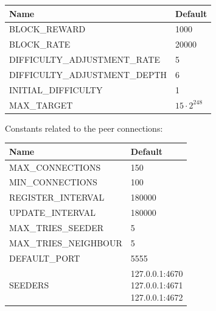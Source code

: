 \documentclass[../documentation.tex]{subfiles}
\begin{document}
\bgroup{}
\def\arraystretch{1.25}
\begin{tabular}{|l|l|}
    \hline
    \textbf{Name} & \textbf{Default}
    \\ \hline
    BLOCK\_REWARD & 1000
    \\ \hline
    BLOCK\_RATE & 20000
    \\ \hline
    DIFFICULTY\_ADJUSTMENT\_RATE & 5
    \\ \hline
    DIFFICULTY\_ADJUSTMENT\_DEPTH & 6
    \\ \hline
    INITIAL\_DIFFICULTY & 1
    \\ \hline
    MAX\_TARGET & \(15 \cdot 2^{248}\)
    \\ \hline
\end{tabular}
\egroup{}

Constants related to the peer connections:

\bgroup{}
\def\arraystretch{1.25}
\begin{tabular}{|l|l|}
    \hline
    \textbf{Name} & \textbf{Default}
    \\ \hline
    MAX\_CONNECTIONS & 150
    \\ \hline
    MIN\_CONNECTIONS & 100
    \\ \hline
    REGISTER\_INTERVAL & 180000
    \\ \hline
    UPDATE\_INTERVAL & 180000
    \\ \hline
    MAX\_TRIES\_SEEDER & 5
    \\ \hline
    MAX\_TRIES\_NEIGHBOUR & 5
    \\ \hline
    DEFAULT\_PORT & 5555
    \\ \hline
    SEEDERS & \makecell[t] {
        127.0.0.1:4670 \\
        127.0.0.1:4671 \\
        127.0.0.1:4672
    }
    \\ \hline
\end{tabular}
\egroup{}

\pagebreak

\end{document}
